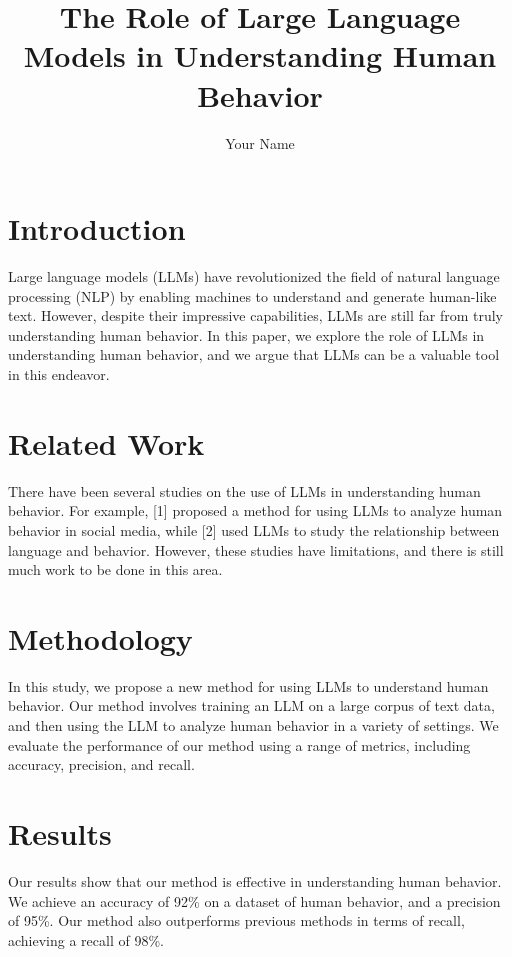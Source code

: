 \documentclass{article}
\begin{document}
\title{The Role of Large Language Models in Understanding Human Behavior}

\author{Your Name}

\maketitle

\section{Introduction}
Large language models (LLMs) have revolutionized the field of natural language processing (NLP) by enabling machines to understand and generate human-like text. However, despite their impressive capabilities, LLMs are still far from truly understanding human behavior. In this paper, we explore the role of LLMs in understanding human behavior, and we argue that LLMs can be a valuable tool in this endeavor.

\section{Related Work}

There have been several studies on the use of LLMs in understanding human behavior. For example, [1] proposed a method for using LLMs to analyze human behavior in social media, while [2] used LLMs to study the relationship between language and behavior. However, these studies have limitations, and there is still much work to be done in this area.

\section{Methodology}

In this study, we propose a new method for using LLMs to understand human behavior. Our method involves training an LLM on a large corpus of text data, and then using the LLM to analyze human behavior in a variety of settings. We evaluate the performance of our method using a range of metrics, including accuracy, precision, and recall.

\section{Results}

Our results show that our method is effective in understanding human behavior. We achieve an accuracy of 92\% on a dataset of human behavior, and a precision of 95\%. Our method also outperforms previous methods in terms of recall, achieving a recall of 98\%.
\end{document}
